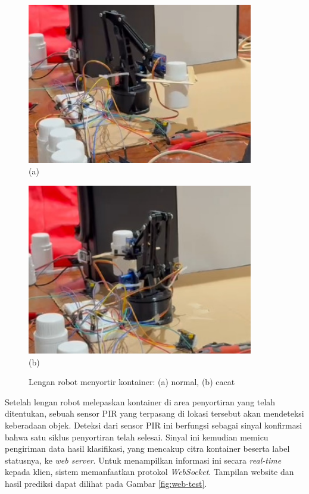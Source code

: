 \begin{figure}[H]
  \centering
  \begin{minipage}{\textwidth}
    \centering
    \includegraphics[width=0.88\textwidth]{gambar/robot_normal.jpeg}\\
    (a)
  \end{minipage}
  \vspace{1em}

  \begin{minipage}{\textwidth}
    \centering
    \includegraphics[width=0.88\textwidth]{gambar/robot_cacat.jpeg}\\
    (b)
  \end{minipage}
  \caption{Lengan robot menyortir kontainer: (a) normal, (b) cacat}
  \label{fig:robot-only}
  \vspace{-1em}
\end{figure}

Setelah lengan robot melepaskan kontainer di area penyortiran yang
telah ditentukan, sebuah sensor PIR yang terpasang di lokasi tersebut
akan mendeteksi keberadaan objek. Deteksi dari sensor PIR ini berfungsi
sebagai sinyal konfirmasi bahwa satu siklus penyortiran telah
selesai. Sinyal ini kemudian memicu pengiriman data hasil
klasifikasi, yang mencakup citra kontainer beserta label statusnya,
ke \textit{web server}. Untuk menampilkan informasi ini secara
\textit{real-time} kepada klien, sistem memanfaatkan protokol
\textit{WebSocket}. Tampilan website dan hasil prediksi dapat dilihat
pada Gambar
\ref{fig:web-test}.

